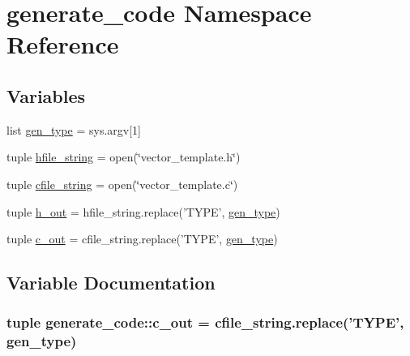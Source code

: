 \hypertarget{namespacegenerate__code}{\section{generate\-\_\-code \-Namespace \-Reference}
\label{namespacegenerate__code}
}
\subsection*{\-Variables}
\begin{DoxyCompactItemize}
\item 
list \hyperlink{namespacegenerate__code_a9e87fddc5c063d2e1bdc2d76b2704051}{gen\-\_\-type} = sys.\-argv\mbox{[}1\mbox{]}
\item 
tuple \hyperlink{namespacegenerate__code_aa76f60e725f6925e2c5588de8a07d8b2}{hfile\-\_\-string} = open(\char`\"{}vector\-\_\-template.\-h\char`\"{})
\item 
tuple \hyperlink{namespacegenerate__code_a6d959ddc98e39bfd1559a60ad99d8626}{cfile\-\_\-string} = open(\char`\"{}vector\-\_\-template.\-c\char`\"{})
\item 
tuple \hyperlink{namespacegenerate__code_a6f897310b3600cecbc4d8ae2b74dd9c0}{h\-\_\-out} = hfile\-\_\-string.\-replace('\-T\-Y\-P\-E', \hyperlink{namespacegenerate__code_a9e87fddc5c063d2e1bdc2d76b2704051}{gen\-\_\-type})
\item 
tuple \hyperlink{namespacegenerate__code_a6e8d7599171fe64e96e58afa8c02cf5c}{c\-\_\-out} = cfile\-\_\-string.\-replace('\-T\-Y\-P\-E', \hyperlink{namespacegenerate__code_a9e87fddc5c063d2e1bdc2d76b2704051}{gen\-\_\-type})
\end{DoxyCompactItemize}


\subsection{\-Variable \-Documentation}
\hypertarget{namespacegenerate__code_a6e8d7599171fe64e96e58afa8c02cf5c}{
\subsubsection[{c\-\_\-out}]{\setlength{\rightskip}{0pt plus 5cm}tuple {\bf generate\-\_\-code\-::c\-\_\-out} = cfile\-\_\-string.\-replace('\-T\-Y\-P\-E', {\bf gen\-\_\-type})}}\label{namespacegenerate__code_a6e8d7599171fe64e96e58afa8c02cf5c}


